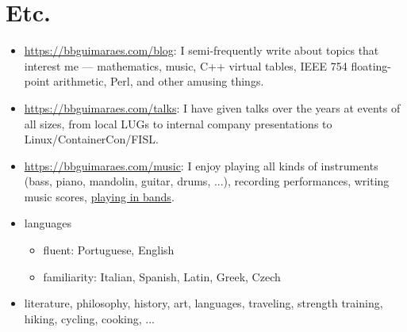 \section*{Etc.}

\begin{itemize}
    \item
        \url{https://bbguimaraes.com/blog}: I semi-frequently write about topics
        that interest me --- mathematics, music, C++ virtual tables, IEEE 754
        floating-point arithmetic, Perl, and other amusing things.
    \item
        \url{https://bbguimaraes.com/talks}: I have given talks over the years
        at events of all sizes, from local LUGs to internal company
        presentations to Linux\slash ContainerCon\slash FISL.
    \item
        \url{https://bbguimaraes.com/music}: I enjoy playing all kinds of
        instruments (bass, piano, mandolin, guitar, drums, ...), recording
        performances, writing music scores,
        \href{https://www.youtube.com/larajackpot}{playing in bands}.
    \item
        languages
        \begin{itemize}
            \item fluent: Portuguese, English
            \item familiarity: Italian, Spanish, Latin, Greek, Czech
        \end{itemize}
    \item
        literature, philosophy, history, art, languages, traveling, strength
        training, hiking, cycling, cooking, ...
\end{itemize}
